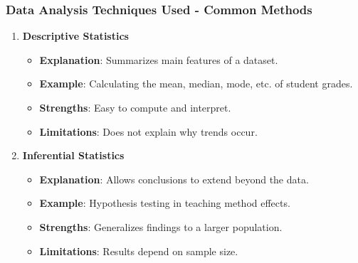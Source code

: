\documentclass{beamer}
\begin{document}
\begin{frame}[fragile]
    \frametitle{Data Analysis Techniques Used - Common Methods}
    \begin{enumerate}
        \item \textbf{Descriptive Statistics}
            \begin{itemize}
                \item \textbf{Explanation}: Summarizes main features of a dataset.
                \item \textbf{Example}: Calculating the mean, median, mode, etc. of student grades.
                \item \textbf{Strengths}: Easy to compute and interpret.
                \item \textbf{Limitations}: Does not explain why trends occur.
            \end{itemize}
        
        \item \textbf{Inferential Statistics}
            \begin{itemize}
                \item \textbf{Explanation}: Allows conclusions to extend beyond the data.
                \item \textbf{Example}: Hypothesis testing in teaching method effects.
                \item \textbf{Strengths}: Generalizes findings to a larger population.
                \item \textbf{Limitations}: Results depend on sample size.
            \end{itemize}
    \end{enumerate}
\end{frame}
\end{document}
